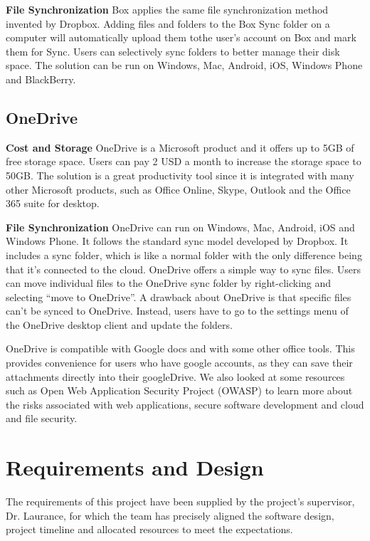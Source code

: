 \documentclass{article}
\begin{document}
\hfill \break
\textbf{File Synchronization}
Box applies the same file synchronization method invented by Dropbox. Adding files and folders to the Box Sync folder on a computer will automatically upload them tothe user's account on Box and mark them for Sync. Users can selectively sync folders to better manage their disk space. The solution can be run on Windows, Mac, Android, iOS, Windows Phone and BlackBerry.

\subsection{OneDrive}
\textbf{Cost and Storage}
OneDrive is a Microsoft product and it offers up to 5GB of free storage space. Users can pay 2 USD a month to increase the storage space to 50GB. The solution is a great productivity tool since it is integrated with many other Microsoft products, such as Office Online, Skype, Outlook and the Office 365 suite for desktop.

\hfill \break
\textbf{File Synchronization}
OneDrive can run on Windows, Mac, Android, iOS and Windows Phone. It follows the standard sync model developed by Dropbox. It includes a sync folder, which is like a normal folder with the only difference being that it's connected to the cloud. OneDrive offers a simple way to sync files. Users can move individual files to the OneDrive sync folder by right-clicking and selecting “move to OneDrive”. A drawback about OneDrive is that specific files can’t be synced to OneDrive. Instead, users have to go to the settings menu of the OneDrive desktop client and update the folders.

OneDrive is compatible with Google docs and with some other office tools. This provides convenience for users who have google accounts, as they can save their attachments directly into their googleDrive.
\newline
\hfill \break
We also looked at some resources such as Open Web Application Security Project (OWASP) to learn more about the risks associated with web applications, secure software development and cloud and file security.

\section{Requirements and Design}
The requirements of this project have been supplied by the project's supervisor, Dr. Laurance, for which the team has precisely aligned the software design, project timeline and allocated resources to meet the expectations.
\end{document}
